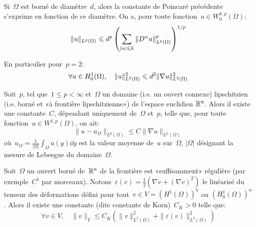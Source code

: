 \medskip

\begin{theoreme}
Si~$\Omega$ est borné de diamètre~$d$, alors la constante de Poincaré précédente s'exprime en fonction de ce diamètre. On a, pour toute fonction~$u\in W_0^{k,p}(\Omega)$:
\begin{equation}
\|u\|_{L^p(\Omega)} \leqslant d^p \left( \displaystyle\sum_{|\alpha|\leqslant k} \|D^\alpha u\|^p_{L^p(\Omega)}\right)^{1/p}
\end{equation}
\end{theoreme}

En particulier pour~$p=2$:
\begin{equation} \colorred\forall u\in H^1_0(\Omega),\quad \|u\|^2_{L^2(\Omega)} \le d^2
\|\nabla u\|^2_{L^2(\Omega)} \end{equation}


\medskip

\begin{theoreme}
Soit~$p$, tel que~$1 \le p <\infty$ et~$\Omega$ un domaine (i.e. un ouvert connexe) lipschitzien (i.e. borné et «à frontière lipschitzienne») de l'espace euclidien $\mathbb R^n$.
Alors il existe une constante~$C$, dépendant uniquement de~$\Omega$ et~$p$, telle que, pour toute fonction~$u\in W^{1,p}(\Omega)$, on ait:
\begin{equation}
\|u-u_\Omega\|_{L^p(\Omega)} \le C \|\nabla u\|_{L^p(\Omega)}
\end{equation}
où~$u_\Omega=\frac1{|\Omega|}\int_\Omega u(y)\dd y$ est la valeur moyenne de~$u$ sur~$\Omega$, $|\Omega|$ désignant la mesure de Lebesgue du domaine~$\Omega$.
\end{theoreme}


\bigskip
\begin{theoreme}
Soit~$\Omega$ un ouvert borné de~$\mathbb R^n$ de la frontière est «suffisamment» régulière (par exemple~$C^1$ par morceaux).
Notons~$\varepsilon(v)=\frac{1}{2}\left(\nabla v + (\nabla v)^T \right)$ le linéarisé du tenseur des déformations défini pour tout~$v\in V=\left(H^1(\Omega)\right)^n$ ou $\left(H^1_0(\Omega)\right)^n$.
Alors il existe une constante (dite constante de Korn)~$C_K>0$ telle que:
\begin{equation}
\forall v\in V, \quad
 \|v\|_{V} \le C_K \left( \|v\|^2_{L^2(\Omega)}+ \|\varepsilon(v)\|^2_{L^2(\Omega)}
\right)
\end{equation}
\end{theoreme}

